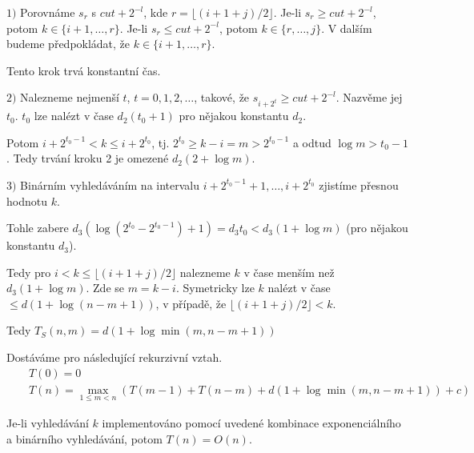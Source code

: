 $1)$ Porovnáme $s_r$ s $cut + 2^{-l}$, kde $r = \lfloor(i + 1 + j) / 2\rfloor$. 
Je-li $s_r \geq cut + 2^{-l}$, potom $k \in \{i + 1, \ldots, r\}$. 
Je-li $s_r \leq cut + 2^{-l}$, potom $k \in \{r, \ldots, j\}$. 
V dalším budeme předpokládat, že $k \in \{i + 1, \ldots, r\}$. 

Tento krok trvá konstantní čas.

$2)$ Nalezneme nejmenší $t$, $t = 0, 1, 2, \ldots$, takové, že $s_{i+2^t} \geq cut + 2^{-l}$.
Nazvěme jej $t_0$. $t_0$ lze nalézt v čase $d_2(t_0 + 1)$ pro nějakou konstantu $d_2$.

Potom $i + 2^{t_0-1} < k \leq i + 2^{t_0}$, tj. $2^{t_0} \geq k - i = m > 2^{t_0-1}$ a odtud $\log m > t_0 - 1$. 
Tedy trvání kroku 2 je omezené $d_2(2 + \log m)$.

$3)$ Binárním vyhledáváním na intervalu 
$i + 2^{t_0-1} + 1, \ldots, i + 2^{t_0}$ zjistíme přesnou hodnotu $k$.

Tohle zabere $d_3(\log(2^{t_0} - 2^{t_0-1}) + 1) = d_3 t_0 < d_3(1 + \log m)$ 
(pro nějakou konstantu $d_3$).

Tedy pro $i < k \leq \lfloor(i + 1 + j) / 2\rfloor$ nalezneme $k$ 
v čase menším než $d_3(1 + \log m)$. Zde se $m = k -i$. Symetricky lze $k$
nalézt v čase $\leq d(1 + \log(n - m + 1))$, v případě, že $\lfloor(i + 1 + j) / 2\rfloor < k$.

Tedy $T_S(n,m) = d(1 + \log \min(m, n - m + 1))$

Dostáváme pro  následující rekurzivní vztah.
\begin{eqnarray} 
\nonumber && T(0) = 0  \\
\nonumber && T(n) = \max_{1 \leq m < n}(T(m-1) + T(n-m) + d(1 + \log \min(m, n - m + 1)) + c)
\end{eqnarray} 

\begin{theorem}
Je-li vyhledávání $k$ implementováno pomocí uvedené kombinace exponenciálního 
a binárního vyhledávání, potom $T(n) = O(n)$.
\end{theorem}

